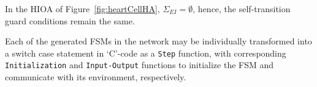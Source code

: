 In the \ac{HIOA} of Figure~\ref{fig:heartCellHA},
$\Sigma_{EI} = \emptyset$, hence, the self-transition guard conditions
remain the same.


Each of the generated \acp{FSM} in the network may be individually
transformed into a switch case statement in `C'-code as a \texttt{Step} 
function, with corresponding \texttt{Initialization} and \texttt{Input-Output}
functions to initialize the \ac{FSM} and communicate with its
environment, respectively.


